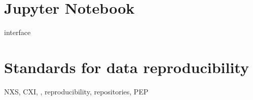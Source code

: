 \section{Jupyter Notebook}
interface

\lipsum

\section{Standards for data reproducibility}

\lipsum
NXS, CXI, , reproducibility, repositories, PEP
